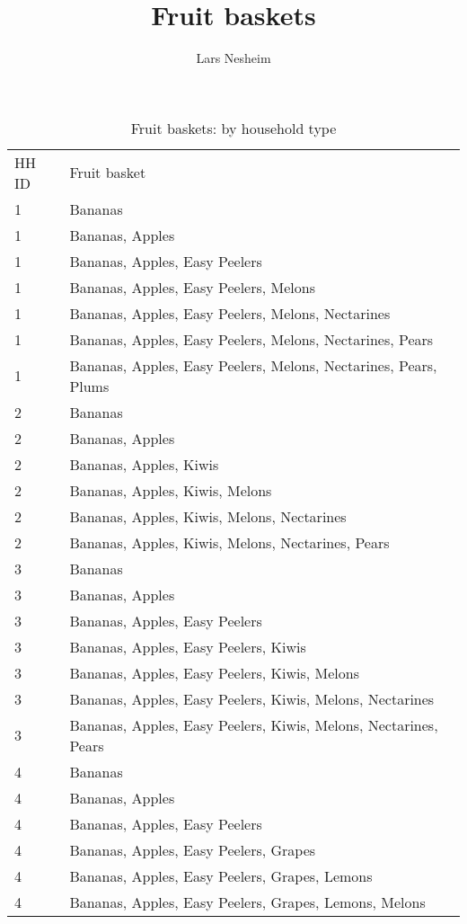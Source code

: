 \documentclass[11pt]{article}
\title{Fruit baskets}
\author{Lars Nesheim}
\date{}
\begin{document}
\maketitle
\begin{table}[h]
\caption{Fruit baskets: by household type}
\label{table:fruit baskets}
\begin{center}
\tiny
\begin{tabular}{ll}
\hline \hline
HH ID & Fruit basket \\
1 & Bananas \\
1 & Bananas, Apples \\
1 & Bananas, Apples, Easy Peelers \\
1 & Bananas, Apples, Easy Peelers, Melons \\
1 & Bananas, Apples, Easy Peelers, Melons, Nectarines \\
1 & Bananas, Apples, Easy Peelers, Melons, Nectarines, Pears \\
1 & Bananas, Apples, Easy Peelers, Melons, Nectarines, Pears, Plums \\
2 & Bananas \\
2 & Bananas, Apples \\
2 & Bananas, Apples, Kiwis \\
2 & Bananas, Apples, Kiwis, Melons \\
2 & Bananas, Apples, Kiwis, Melons, Nectarines \\
2 & Bananas, Apples, Kiwis, Melons, Nectarines, Pears \\
3 & Bananas \\
3 & Bananas, Apples \\
3 & Bananas, Apples, Easy Peelers \\
3 & Bananas, Apples, Easy Peelers, Kiwis \\
3 & Bananas, Apples, Easy Peelers, Kiwis, Melons \\
3 & Bananas, Apples, Easy Peelers, Kiwis, Melons, Nectarines \\
3 & Bananas, Apples, Easy Peelers, Kiwis, Melons, Nectarines, Pears \\
4 & Bananas \\
4 & Bananas, Apples \\
4 & Bananas, Apples, Easy Peelers \\
4 & Bananas, Apples, Easy Peelers, Grapes \\
4 & Bananas, Apples, Easy Peelers, Grapes, Lemons \\
4 & Bananas, Apples, Easy Peelers, Grapes, Lemons, Melons \\

\end{tabular}
\end{center}
\end{table}
\end{document}
